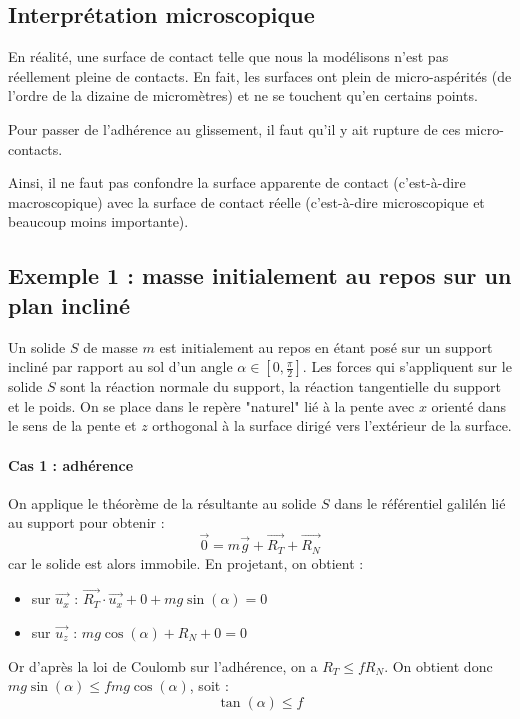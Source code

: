 \documentclass[french]{book}
\theoremstyle{plain}
\theoremstyle{definition}
\theoremstyle{remark}
\begin{document}
\subsection{Interprétation microscopique}
En réalité, une surface de contact telle que nous la modélisons n'est pas réellement pleine de contacts. En fait, les surfaces ont plein de micro-aspérités (de l'ordre de la dizaine de micromètres) et ne se touchent qu'en certains points. \\
\par Pour passer de l'adhérence au glissement, il faut qu'il y ait rupture de ces micro-contacts. \\
\par Ainsi, il ne faut pas confondre la surface apparente de contact (c'est-à-dire macroscopique) avec la surface de contact réelle (c'est-à-dire microscopique et beaucoup moins importante).
\subsection{Exemple 1 : masse initialement au repos sur un plan incliné}
Un solide $S$ de masse $m$ est initialement au repos en étant posé sur un support incliné par rapport au sol d'un angle $\displaystyle\alpha\in\left[0,\frac{\pi}{2}\right]$. Les forces qui s'appliquent sur le solide $S$ sont la réaction normale du support, la réaction tangentielle du support et le poids. On se place dans le repère "naturel" lié à la pente avec $x$ orienté dans le sens de la pente et $z$ orthogonal à la surface dirigé vers l'extérieur de la surface.
\paragraph{Cas 1 : adhérence}
On applique le théorème de la résultante au solide $S$ dans le référentiel galilén lié au support pour obtenir : $$\overrightarrow{0}=m\overrightarrow{g}+\overrightarrow{R_T}+\overrightarrow{R_N}$$ car le solide est alors immobile. En projetant, on obtient :
\begin{itemize}
	\item sur $\overrightarrow{u_x}$ : $\overrightarrow{R_T}\cdot\overrightarrow{u_x}+0+mg\sin(\alpha)=0$
	\item sur $\overrightarrow{u_z}$ : $mg\cos(\alpha)+R_N+0=0$
\end{itemize}
Or d'après la loi de Coulomb sur l'adhérence, on a $R_T\leqslant fR_N$. On obtient donc $mg\sin(\alpha)\leqslant fmg\cos(\alpha)$, soit : $$\tan(\alpha)\leqslant f$$
\end{document}

